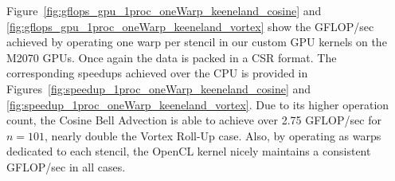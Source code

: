 Figure~\ref{fig:gflops_gpu_1proc_oneWarp_keeneland_cosine} and \ref{fig:gflops_gpu_1proc_oneWarp_keeneland_vortex} show the GFLOP/sec achieved by operating one warp per stencil in our custom GPU kernels on the M2070 GPUs. Once again the data is packed in a CSR format. The corresponding speedups achieved over the CPU is provided in Figures~\ref{fig:speedup_1proc_oneWarp_keeneland_cosine} and \ref{fig:speedup_1proc_oneWarp_keeneland_vortex}. Due to its higher operation count, the Cosine Bell Advection is able to achieve over 2.75 GFLOP/sec for $n=101$, nearly double the Vortex Roll-Up case. Also, by operating as warps dedicated to each stencil, the OpenCL kernel nicely maintains a consistent GFLOP/sec in all cases. 


